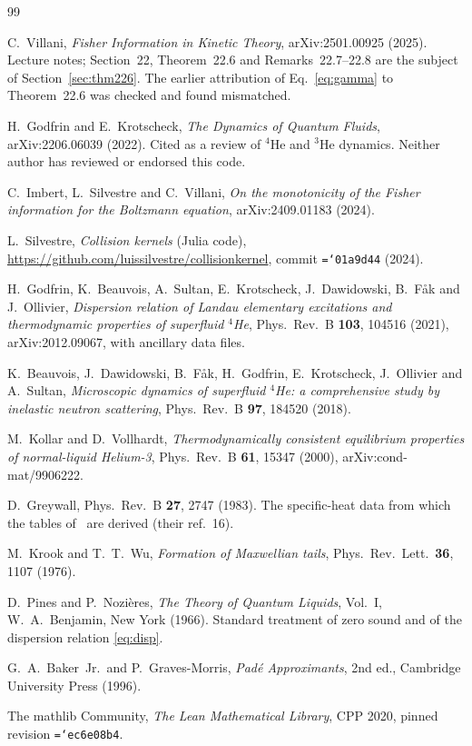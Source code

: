 \documentclass[11pt,a4paper]{article}
\newcommand{\code}[1]{\texttt{\hyphenchar\font=`\-\relax #1}}
\begin{document}
\begin{thebibliography}{99}

C.~Villani,
\emph{Fisher Information in Kinetic Theory},
arXiv:2501.00925 (2025).
Lecture notes; Section~22, Theorem~22.6 and Remarks~22.7--22.8 are the subject of
Section~\ref{sec:thm226}. The earlier attribution of Eq.~\eqref{eq:gamma} to Theorem~22.6 was
checked and found mismatched.

H.~Godfrin and E.~Krotscheck,
\emph{The Dynamics of Quantum Fluids},
arXiv:2206.06039 (2022).
Cited as a review of $^4$He and $^3$He dynamics. Neither author has reviewed or
endorsed this code.

C.~Imbert, L.~Silvestre and C.~Villani,
\emph{On the monotonicity of the Fisher information for the Boltzmann equation},
arXiv:2409.01183 (2024).

L.~Silvestre, \emph{Collision kernels} (Julia code),
\url{https://github.com/luissilvestre/collisionkernel}, commit \code{01a9d44} (2024).

H.~Godfrin, K.~Beauvois, A.~Sultan, E.~Krotscheck, J.~Dawidowski, B.~F\aa k and J.~Ollivier,
\emph{Dispersion relation of Landau elementary excitations and thermodynamic properties of
superfluid $^4$He}, Phys.\ Rev.\ B \textbf{103}, 104516 (2021), arXiv:2012.09067, with
ancillary data files.

K.~Beauvois, J.~Dawidowski, B.~F\aa k, H.~Godfrin, E.~Krotscheck, J.~Ollivier and A.~Sultan,
\emph{Microscopic dynamics of superfluid $^4$He: a comprehensive study by inelastic neutron
scattering}, Phys.\ Rev.\ B \textbf{97}, 184520 (2018).

M.~Kollar and D.~Vollhardt,
\emph{Thermodynamically consistent equilibrium properties of normal-liquid Helium-3},
Phys.\ Rev.\ B \textbf{61}, 15347 (2000), arXiv:cond-mat/9906222.

D.~Greywall, Phys.\ Rev.\ B \textbf{27}, 2747 (1983). The specific-heat data from which the
tables of~\cite{kollar2000} are derived (their ref.~16).

M.~Krook and T.~T.~Wu, \emph{Formation of Maxwellian tails},
Phys.\ Rev.\ Lett.\ \textbf{36}, 1107 (1976).

D.~Pines and P.~Nozi\`eres,
\emph{The Theory of Quantum Liquids}, Vol.~I,
W.~A.~Benjamin, New York (1966).
Standard treatment of zero sound and of the dispersion relation
\eqref{eq:disp}.

G.~A.~Baker~Jr.\ and P.~Graves-Morris,
\emph{Pad\'e Approximants}, 2nd ed.,
Cambridge University Press (1996).

The mathlib Community,
\emph{The Lean Mathematical Library},
CPP 2020, pinned revision \code{ec6e08b4}.

\end{thebibliography}
\end{document}
